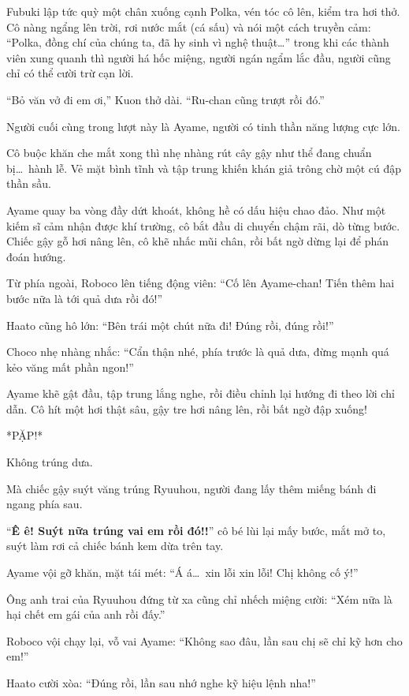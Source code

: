 \documentclass[../main.tex]{subfiles}
\begin{document}
Fubuki lập tức quỳ một chân xuống cạnh Polka, vén tóc cô lên, kiểm tra hơi thở. Cô nàng ngẩng lên trời, rơi nước mắt (cá sấu) và nói một cách truyền cảm: ``Polka, đồng chí của chúng ta, đã hy sinh vì nghệ thuật\dots'' trong khi các thành viên xung quanh thì người há hốc miệng, người ngán ngẩm lắc đầu, người cũng chỉ có thể cười trừ cạn lời.

``Bỏ văn vở đi em ơi,'' Kuon thở dài. ``Ru-chan cũng trượt rồi đó.''

\ct

Người cuối cùng trong lượt này là Ayame, người có tinh thần năng lượng cực lớn.

Cô buộc khăn che mắt xong thì nhẹ nhàng rút cây gậy như thể đang chuẩn bị\dots\ hành lễ. Vẻ mặt bình tĩnh và tập trung khiến khán giả trông chờ một cú đập thần sầu.

Ayame quay ba vòng đầy dứt khoát, không hề có dấu hiệu chao đảo. Như một kiếm sĩ cảm nhận được khí trường, cô bắt đầu di chuyển chậm rãi, dò từng bước. Chiếc gậy gỗ hơi nâng lên, cô khẽ nhấc mũi chân, rồi bất ngờ dừng lại để phán đoán hướng.

Từ phía ngoài, Roboco lên tiếng động viên: ``Cố lên Ayame-chan! Tiến thêm hai bước nữa là tới quả dưa rồi đó!''

Haato cũng hô lớn: ``Bên trái một chút nữa đi! Đúng rồi, đúng rồi!''

Choco nhẹ nhàng nhắc: ``Cẩn thận nhé, phía trước là quả dưa, đừng mạnh quá kẻo văng mất phần ngon!''

Ayame khẽ gật đầu, tập trung lắng nghe, rồi điều chỉnh lại hướng đi theo lời chỉ dẫn. Cô hít một hơi thật sâu, gậy tre hơi nâng lên, rồi bất ngờ đập xuống!

*PẶP!*

Không trúng dưa.

Mà chiếc gậy suýt văng trúng Ryuuhou, người đang lấy thêm miếng bánh đi ngang phía sau.

``\textbf{Ê ê! Suýt nữa trúng vai em rồi đó!!}'' cô bé lùi lại mấy bước, mắt mở to, suýt làm rơi cả chiếc bánh kem dừa trên tay.

Ayame vội gỡ khăn, mặt tái mét: ``Á á\dots\ xin lỗi xin lỗi! Chị không cố ý!''

Ông anh trai của Ryuuhou đứng từ xa cũng chỉ nhếch miệng cười: ``Xém nữa là hại chết em gái của anh rồi đấy.''

Roboco vội chạy lại, vỗ vai Ayame: ``Không sao đâu, lần sau chị sẽ chỉ kỹ hơn cho em!''

Haato cười xòa: ``Đúng rồi, lần sau nhớ nghe kỹ hiệu lệnh nha!''
\end{document}
